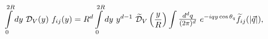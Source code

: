 \begin{equation}
 \label{corr3}
   \int\limits_0^{2R} dy~ {\cal D}_V(y)~ f_{ij}(y)    =
   R^d\int\limits_0^{2R} dy~ y^{d-1}
  ~\widetilde{\cal D}_V\left(\frac{y}{R}\right)
    \int \hbox{\large$\frac{d^dq}{(2\pi)^d}$} ~ e^{-iqy \cos\theta_q}
        \widetilde{f}_{ij}(|\vec{q}|),
\end{equation}

